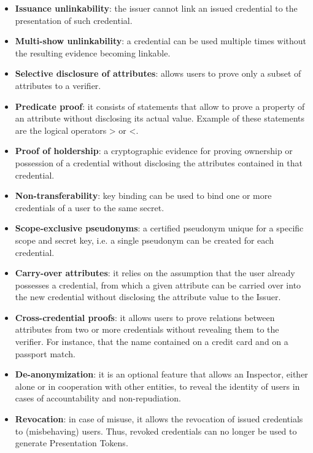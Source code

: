 \begin{itemize}
		
	\item \textbf{Issuance unlinkability}: the issuer cannot link an issued credential to the presentation of such credential.

	\item \textbf{Multi-show unlinkability}: a credential can be used multiple times without
	the resulting evidence becoming linkable.
	
	\item \textbf{Selective disclosure of attributes}: allows users to prove only a subset of
	attributes to a verifier.
	
	\item \textbf{Predicate proof}: it consists of statements that allow to prove a property
	of an attribute without disclosing its actual value. Example of these statements
	are the logical operators > or <.
	
	\item \textbf{Proof of holdership}: a cryptographic evidence for proving ownership or
	possession of a credential without disclosing the attributes contained in
	that credential.
	
	\item \textbf{Non-transferability}: key binding can be used to bind one or more credentials
	of a user to the same secret.
	
	\item \textbf{Scope-exclusive pseudonyms}: a certified pseudonym unique for a specific
	scope and secret key, i.e. a single pseudonym can be created for each credential.
	
	\item \textbf{Carry-over attributes}: it relies on the assumption that the user already
	possesses a credential, from which a given attribute can be carried over
	into the new credential without disclosing the attribute value to the Issuer.
	
	\item \textbf{Cross-credential proofs}: it allows users to prove relations between attributes
	from two or more credentials without revealing them to the verifier. For
	instance, that the name contained on a credit card and on a passport
	match.
	
	\item \textbf{De-anonymization}: it is an optional feature that allows an Inspector, either
	alone or in cooperation with other entities, to reveal the identity of users
	in cases of accountability and non-repudiation.
	
	\item \textbf{Revocation}: in case of misuse, it allows the revocation of issued credentials
	to (misbehaving) users. Thus, revoked credentials can no longer be used to
	generate Presentation Tokens.

\end{itemize}


